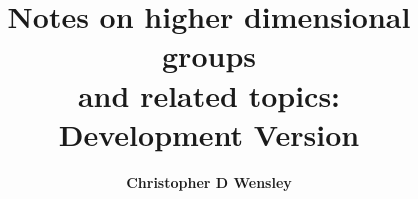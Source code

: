 \documentclass[11pt,a4paper]{article}
\begin{document}
  \title
  {\bf Notes on higher dimensional groups\\
       and related topics:\\
       Development Version}
    \author{{\bf Christopher D Wensley}}
  \maketitle

\tableofcontents

\newpage 

\newpage 

\newpage 

\newpage 

\newpage 

\newpage 

\newpage 

\newpage 


\newpage  


\newpage  
 

\newpage 

\newpage  

\newpage 

\newpage  
 

\newpage 

\newpage 

\newpage 

\newpage 

\newpage 

\newpage  

\printindex
\end{document}
